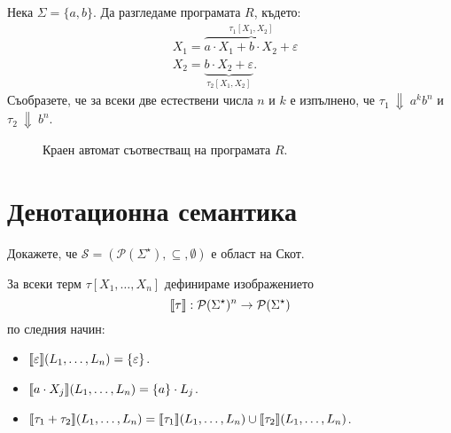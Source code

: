 \begin{example}
  Нека $\Sigma = \{a,b\}$. Да разгледаме програмата $R$, където:
  \begin{align*}
    & X_1 = \overbrace{a \cdot X_1 + b \cdot X_2 + \varepsilon}^{\tau_1[X_1,X_2]}\\
    & X_2 = \underbrace{b \cdot X_2 + \varepsilon}_{\tau_2[X_1,X_2]}.
  \end{align*}
  Съобразете, че за всеки две естествени числа $n$ и $k$ е изпълнено, че $\tau_1~\Downarrow~a^k b^n$ и $\tau_2~\Downarrow~b^n$.
  \begin{figure}[H]
      \centering
      \caption{Краен автомат съотвестващ на програмата $R$.}
    \end{figure}
\end{example}

\section{Денотационна семантика}
\label{reg:sect:denotational-semantics}


\begin{problem}
  Докажете, че $\mathcal{S} = (\mathcal{P}(\Sigma^\star), \subseteq, \emptyset)$ е област на Скот.
\end{problem}

За всеки терм $\tau[X_1,\dots,X_n]$ дефинираме изображението
\[\llbracket{\tau}\rrbracket: \mathcal{P}(\Sigma^\star)^n \to \mathcal{P}(\Sigma^\star)\]
 по следния начин:
\begin{itemize}
\item 
  $\llbracket{\varepsilon}\rrbracket(L_1,\dots,L_n) = \{\varepsilon\}$.
\item 
  $\llbracket{a \cdot X_j}\rrbracket(L_1,\dots,L_n) = \{a\} \cdot L_j$.
\item
  $\llbracket{\tau_1 + \tau_2}\rrbracket(L_1,\dots,L_n) = \llbracket{\tau_1}\rrbracket(L_1,\dots,L_n) \cup \llbracket{\tau_2}\rrbracket(L_1,\dots,L_n)$.
\end{itemize}

